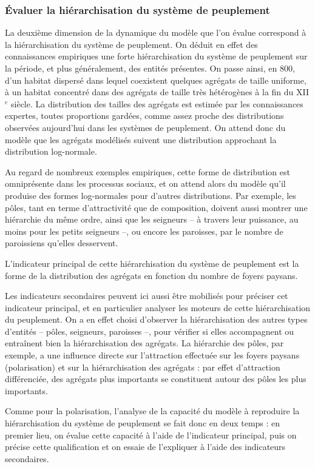 \subsubsection{Évaluer la hiérarchisation du système de peuplement}

La deuxième dimension de la dynamique du modèle \simfeodal{} que l'on évalue correspond à la hiérarchisation du système de peuplement.
On déduit en effet des connaissances empiriques une forte hiérarchisation du système de peuplement sur la période, et plus généralement, des entités présentes.
On passe ainsi, en 800, d'un habitat dispersé dans lequel coexistent quelques agrégats de taille uniforme, à un habitat concentré dans des agrégats de taille très hétérogènes à la fin du XII$^e$ siècle.
La distribution des tailles des agrégats est estimée par les connaissances expertes, toutes proportions gardées, comme assez proche des distributions observées aujourd'hui dans les systèmes de peuplement.
On attend donc du modèle que les agrégats modélisés suivent une distribution approchant la distribution log-normale.

Au regard de nombreux exemples empiriques, cette forme de distribution est omniprésente dans les processus sociaux, et on attend alors du modèle qu'il produise des formes log-normales pour d'autres distributions.
Par exemple, les pôles, tant en terme d'attractivité que de composition, doivent aussi montrer une hiérarchie du même ordre, ainsi que les seigneurs -- à travers leur puissance, au moins pour les petits seigneurs --, ou encore les paroisses, par le nombre de paroissiens qu'elles desservent.

L'indicateur principal de cette hiérarchisation du système de peuplement est
la forme de la distribution des agrégats en fonction du nombre de foyers paysans.

Les indicateurs secondaires peuvent ici aussi être mobilisés pour préciser cet indicateur principal, et en particulier analyser les moteurs de cette hiérarchisation du peuplement.
On a en effet choisi d'observer la hiérarchisation des autres types d'entités -- pôles, seigneurs, paroisses --, pour vérifier si elles accompagnent ou entraînent bien la hiérarchisation des agrégats.
La hiérarchie des pôles, par exemple, a une influence directe sur l'attraction effectuée sur les foyers paysans (polarisation) et sur la hiérarchisation des agrégats :
par effet d'attraction différenciée, des agrégats plus importants se constituent autour des pôles les plus importants.

Comme pour la polarisation, l'analyse de la capacité du modèle à reproduire la hiérarchisation du système de peuplement se fait donc en deux temps :
en premier lieu, on évalue cette capacité à l'aide de l'indicateur principal, puis on précise cette qualification et on essaie de l'expliquer à l'aide des indicateurs secondaires.

